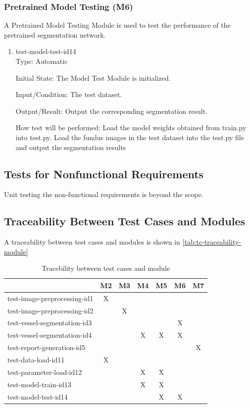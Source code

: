 \documentclass[12pt, titlepage]{article}
\begin{document}
\subsubsection{Pretrained Model Testing (M6)}
A Pretrained Model Testing Module is used to test the performance of the pretrained segmentation network.

\begin{enumerate}

\item{test-model-test-id14\\}
Type: Automatic
					
Initial State: The Model Test Module is initialized.
					
Input/Condition: The test dataset. 
					
Output/Result: Output the corresponding segmentation result.
					
How test will be performed: Load the model weights obtained from train.py into test.py. Load the fundus images in the test dataset into the test.py file and output the segmentation results

\end{enumerate}


\subsection{Tests for Nonfunctional Requirements}
Unit testing the non-functional requirements is beyond the scope.

\subsection{Traceability Between Test Cases and Modules}
A traceability between test cases and modules is shown in \autoref{tab:tc-traceability-module} 

\begin{table}[h!]
\begin{center}
\begin{tabular}{ l|c|c|c|c|c|c }
\hline
 & M2  & M3 & M4 & M5 & M6 & M7   \\
\hline
test-image-preprocessing-id1 &X & & & & &   \\
\hline
test-image-preprocessing-id2 & &X & & & &  \\
\hline
test-vessel-segmentation-id3 & & & & &X &  \\
\hline
test-vessel-segmentation-id4 & & & X & X & X& \\
\hline
test-report-generation-id5 & & & & & &X  \\
\hline
test-data-load-id11 &X &  & & & & \\
\hline
test-parameter-load-id12 & & &X &X &  & \\
\hline
test-model-train-id13 & & &X &X &  &  \\
\hline
test-model-test-id14 &  & & &X &X & \\

\hline
\end{tabular}
\caption{Tracebility between test cases and module}
\label{tab:tc-traceability-module}
\end{center}
\end{table}
\end{document}
